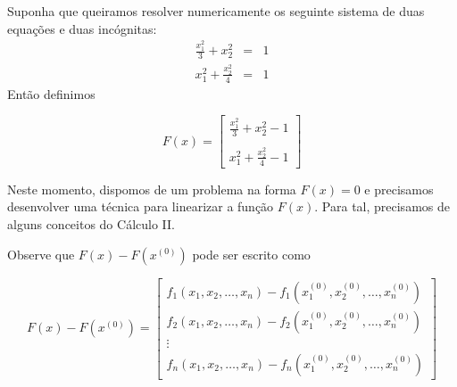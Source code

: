 \documentclass[main.tex]{subfiles}
\begin{document}
\begin{ex} Suponha que queiramos resolver numericamente os seguinte sistema de duas equações e duas incógnitas:
\begin{eqnarray*}
\frac{x_1^2}{3}+x_2^2&=&1\\
x_1^2+\frac{x_2^2}{4}&=&1
\end{eqnarray*}
Então definimos

$$F(x)=\left[
\begin{array}{c}
\frac{x_1^2}{3}+x_2^2-1\\~\\
x_1^2+\frac{x_2^2}{4}-1
\end{array}
\right]$$
\end{ex}
Neste momento, dispomos de um problema na forma $F(x)=0$ e precisamos desenvolver uma técnica para linearizar a função $F(x)$. Para tal, precisamos de alguns conceitos do Cálculo II.

Observe que $F(x)-F(x^{(0)})$ pode ser escrito como

$$F(x)-F(x^{(0)})=\left[
\begin{array}{c}
f_1(x_1,x_2,\ldots,x_n)-f_1(x_1^{(0)},x_2^{(0)},\ldots,x_n^{(0)})\\
f_2(x_1,x_2,\ldots,x_n)-f_2(x_1^{(0)},x_2^{(0)},\ldots,x_n^{(0)})\\
\vdots\\
f_n(x_1,x_2,\ldots,x_n)-f_n(x_1^{(0)},x_2^{(0)},\ldots,x_n^{(0)})
\end{array}
\right]$$
\end{document}
